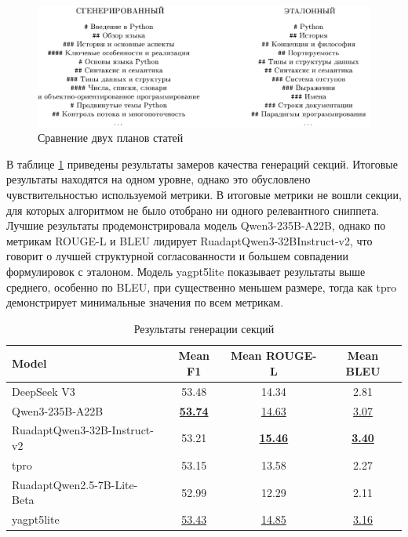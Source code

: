 \documentclass{article}
\begin{document}
\begin{figure}[ht!]
  \centering
  \includegraphics[width=\textwidth]{figures/outline.png}
  \caption{Сравнение двух планов статей}
  \label{fig:outline}
\end{figure}

В таблице \ref{tab:secs} приведены результаты замеров качества генераций секций. Итоговые результаты находятся на одном уровне, однако это обусловлено чувствительностью используемой метрики.
В итоговые метрики не вошли секции, для которых алгоритмом не было отобрано ни одного релевантного сниппета. Лучшие результаты 
продемонстрировала модель Qwen3-\allowbreak 235B-\allowbreak A22B, однако по метрикам ROUGE-\allowbreak L и BLEU лидирует RuadaptQwen3-\allowbreak 32BInstruct-v2, что говорит о лучшей структурной согласованности и 
большем совпадении формулировок с эталоном.
Модель yagpt5lite показывает результаты выше среднего, особенно по BLEU, при существенно меньшем размере, тогда как tpro демонстрирует минимальные значения по всем метрикам.

\begin{table}[ht!]
\centering
\caption{Результаты генерации секций}
\begin{tabular}{l|c|c|c}
\hline
\textbf{Model} & \textbf{Mean F1} & \textbf{Mean ROUGE-L} & \textbf{Mean BLEU} \\
\hline
DeepSeek V3                                         & 53.48 & 14.34 & 2.81 \\
Qwen3-235B-A22B                                     & \uline{\textbf{53.74}} & \uline{14.63} & \uline{3.07} \\
\hline
RuadaptQwen3-32B-Instruct-v2                        & 53.21 & \uline{\textbf{15.46}} & \uline{\textbf{3.40}} \\
tpro                                                & 53.15 & 13.58 & 2.27 \\
\hline
RuadaptQwen2.5-7B-\allowbreak Lite-\allowbreak Beta & 52.99 & 12.29 & 2.11 \\
yagpt5lite                                          & \uline{53.43} & \uline{14.85} & \uline{3.16} \\
\hline
\end{tabular}
\label{tab:secs}
\end{table}
\end{document}

